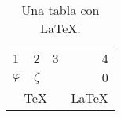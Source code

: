 \begin{exampletwoup}
\begin{table}[ht!]
\centering
\caption{Una tabla con \LaTeX.}
\begin{tabular}{|l|c|p{2cm}|r|}
\hline
1                          & 2       & 3 & 4   \\
\cline{2-3}
$\varphi$                  & $\zeta$ &   & $0$ \\
\hline
\multicolumn{3}{|c|}{\TeX} & \LaTeX            \\
\hline
\end{tabular}
\end{table}
\end{exampletwoup}
